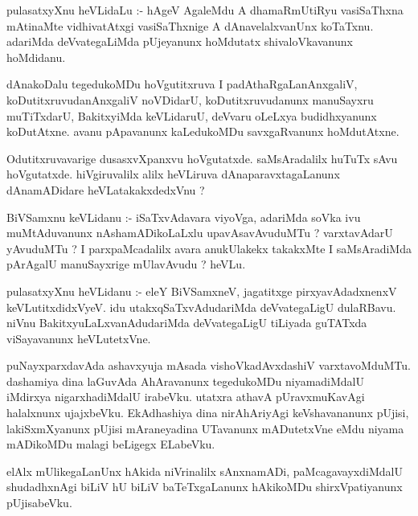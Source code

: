 \documentclass{article}
\begin{document}
\begin{mn}
pulasatxyXnu  heVLidaLu :- hAgeV  AgaleMdu  A  dhamaRmUtiRyu  vasiSaThxna  mAtinaMte  
vidhivatAtxgi  vasiSaThxnige  A  dAnavelalxvanUnx  koTaTxnu.  adariMda  deVvategaLiMda  
pUjeyanunx  hoMdutatx  shivaloVkavanunx  hoMdidanu.
\end{mn}

\begin{mn}
dAnakoDalu  tegedukoMDu  hoVgutitxruva  I  padAthaRgaLanAnxgaliV,  koDutitxruvudanAnxgaliV  
noVDidarU,  koDutitxruvudanunx  manuSayxru  muTiTxdarU,  BakitxyiMda  keVLidaruU,  deVvaru  
oLeLxya  budidhxyanunx  koDutAtxne.  avanu  pApavanunx  kaLedukoMDu  savxgaRvanunx  hoMdutAtxne.  
\end{mn}

\begin{mn}
Odutitxruvavarige  dusasxvXpanxvu  hoVgutatxde.  saMsAradalilx  huTuTx  sAvu  hoVgutatxde.  
hiVgiruvalilx  alilx  heVLiruva  dAnaparavxtagaLanunx  dAnamADidare  heVLatakakxdedxVnu ?
\end{mn}

\begin{mn}
BiVSamxnu  keVLidanu :- iSaTxvAdavara  viyoVga,  adariMda  soVka  ivu  muMtAduvanunx  
nAshamADikoLaLxlu  upavAsavAvuduMTu ?  varxtavAdarU  yAvuduMTu ?  I  parxpaMcadalilx  
avara  anukUlakekx  takakxMte  I  saMsAradiMda  pArAgalU  manuSayxrige  mUlavAvudu ?  heVLu.
\end{mn}

\begin{mn}
pulasatxyXnu  heVLidanu :- eleY  BiVSamxneV,  jagatitxge  pirxyavAdadxnenxV  keVLutitxdidxVyeV.  
idu  utakxqSaTxvAdudariMda  deVvategaLigU  dulaRBavu.  niVnu  BakitxyuLaLxvanAdudariMda  
deVvategaLigU  tiLiyada  guTATxda  viSayavanunx  heVLutetxVne.
\end{mn}

\begin{mn}
puNayxparxdavAda  ashavxyuja  mAsada  vishoVkadAvxdashiV  varxtavoMduMTu.  dashamiya  dina  
laGuvAda  AhAravanunx  tegedukoMDu  niyamadiMdalU  iMdirxya nigarxhadiMdalU  irabeVku.  
utatxra  athavA  pUravxmuKavAgi  halalxnunx  ujajxbeVku.  EkAdhashiya  dina  nirAhAriyAgi  
keVshavananunx  pUjisi,  lakiSxmXyanunx  pUjisi  mAraneyadina  UTavanunx  mADutetxVne  
eMdu  niyama mADikoMDu  malagi  beLigegx  ELabeVku.
\end{mn}

\begin{mn}
elAlx  mUlikegaLanUnx  hAkida  niVrinalilx  sAnxnamADi,  paMcagavayxdiMdalU  shudadhxnAgi  
biLiV  hU  biLiV  baTeTxgaLanunx  hAkikoMDu  shirxVpatiyanunx  pUjisabeVku.
\end{mn}
\end{document}
